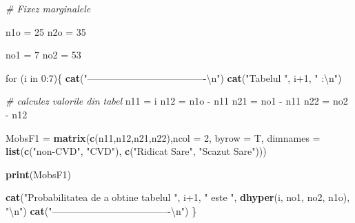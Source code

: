 \documentclass[]{article}
\newenvironment{Shaded}{\begin{snugshade}}{\end{snugshade}}
\newcommand{\KeywordTok}[1]{\textcolor[rgb]{0.13,0.29,0.53}{\textbf{{#1}}}}
\newcommand{\DataTypeTok}[1]{\textcolor[rgb]{0.13,0.29,0.53}{{#1}}}
\newcommand{\DecValTok}[1]{\textcolor[rgb]{0.00,0.00,0.81}{{#1}}}
\newcommand{\CharTok}[1]{\textcolor[rgb]{0.31,0.60,0.02}{{#1}}}
\newcommand{\StringTok}[1]{\textcolor[rgb]{0.31,0.60,0.02}{{#1}}}
\newcommand{\CommentTok}[1]{\textcolor[rgb]{0.56,0.35,0.01}{\textit{{#1}}}}
\newcommand{\NormalTok}[1]{{#1}}
\begin{document}
\begin{Shaded}
\begin{Highlighting}[]
\CommentTok{# Fixez marginalele}

\NormalTok{n1o =}\StringTok{ }\DecValTok{25}
\NormalTok{n2o =}\StringTok{ }\DecValTok{35}
  
\NormalTok{no1 =}\StringTok{ }\DecValTok{7}
\NormalTok{no2 =}\StringTok{ }\DecValTok{53}

\NormalTok{for (i in }\DecValTok{0}\NormalTok{:}\DecValTok{7}\NormalTok{)\{}
  \KeywordTok{cat}\NormalTok{(}\StringTok{"-------------------------------------}\CharTok{\textbackslash{}n}\StringTok{"}\NormalTok{)}
  \KeywordTok{cat}\NormalTok{(}\StringTok{"Tabelul "}\NormalTok{, i}\DecValTok{+1}\NormalTok{, }\StringTok{" :}\CharTok{\textbackslash{}n}\StringTok{"}\NormalTok{)}
  
  \CommentTok{# calculez valorile din tabel}
  \NormalTok{n11 =}\StringTok{ }\NormalTok{i}
  \NormalTok{n12 =}\StringTok{ }\NormalTok{n1o -}\StringTok{ }\NormalTok{n11}
  \NormalTok{n21 =}\StringTok{ }\NormalTok{no1 -}\StringTok{ }\NormalTok{n11}
  \NormalTok{n22 =}\StringTok{ }\NormalTok{no2 -}\StringTok{ }\NormalTok{n12}
  
  \NormalTok{MobsF1 =}\StringTok{ }\KeywordTok{matrix}\NormalTok{(}\KeywordTok{c}\NormalTok{(n11,n12,n21,n22),}\DataTypeTok{ncol =} \DecValTok{2}\NormalTok{, }\DataTypeTok{byrow =} \NormalTok{T, }
                  \DataTypeTok{dimnames =} \KeywordTok{list}\NormalTok{(}\KeywordTok{c}\NormalTok{(}\StringTok{"non-CVD"}\NormalTok{, }\StringTok{"CVD"}\NormalTok{), }\KeywordTok{c}\NormalTok{(}\StringTok{"Ridicat Sare"}\NormalTok{, }\StringTok{"Scazut Sare"}\NormalTok{)))}
  
  \KeywordTok{print}\NormalTok{(MobsF1)}
  
  \KeywordTok{cat}\NormalTok{(}\StringTok{"Probabilitatea de a obtine tabelul "}\NormalTok{, i}\DecValTok{+1}\NormalTok{, }\StringTok{" este "}\NormalTok{, }
      \KeywordTok{dhyper}\NormalTok{(i, no1, no2, n1o), }\StringTok{"}\CharTok{\textbackslash{}n}\StringTok{"}\NormalTok{)}
  \KeywordTok{cat}\NormalTok{(}\StringTok{"-------------------------------------}\CharTok{\textbackslash{}n}\StringTok{"}\NormalTok{)}
\NormalTok{\}}
\end{Highlighting}
\end{Shaded}
\end{document}
